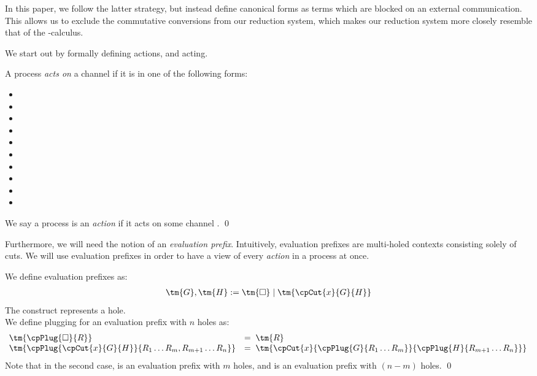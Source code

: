 \documentclass[UKenglish]{llncs}
\begin{document}
In this paper, we follow the latter strategy, but instead define canonical forms
as terms which are blocked on an external communication.
This allows us to exclude the commutative conversions from our reduction system,
which makes our reduction system more closely resemble that of the
\textpi-calculus.

We start out by formally defining actions, and acting.
\begin{definition}[Actions]\label{def:cp-action}
  A process  \emph{acts on} a channel  if it is in one of the
  following forms:
  \begin{multicols}{3}
    \begin{itemize}[noitemsep,topsep=0pt,parsep=0pt,partopsep=0pt]
    \item {}
    \item {}
    \item {}
    \item {}
    \item {}
    \item {}
    \item {}
    \item {}
    \item {}
    \item {}
    \end{itemize}
  \end{multicols}
  \noindent
  We say a process  is an \emph{action} if it acts on some channel .
  \qed
\end{definition}
Furthermore, we will need the notion of an \emph{evaluation prefix}.
Intuitively, evaluation prefixes are multi-holed contexts consisting solely of
cuts. We will use evaluation prefixes in order to have a view of every
\emph{action} in a process at once.
\begin{definition}\label{def:cp-evaluation-prefixes}
  We define evaluation prefixes as:
  \begin{align*}
    \tm{G}, \tm{H} := \tm{\Box} \mid \tm{\cpCut{x}{G}{H}}
  \end{align*}
  The \tm{\Box} construct represents a hole.
  \\
  We define plugging for an evaluation prefix with $n$ holes as:
  \begin{align*}
    \!\begin{array}{ll}
      \tm{\cpPlug{\Box}{R}} & = \; \tm{R} \\
      \tm{\cpPlug{\cpCut{x}{G}{H}}{R_1 \dots R_m, R_{m+1} \dots R_{n}}}
                            & = \; \tm{\cpCut{x}{\cpPlug{G}{R_1 \dots R_m}}{\cpPlug{H}{R_{m+1} \dots R_n}}}
    \end{array}
  \end{align*}
  Note that in the second case,  is an evaluation prefix with $m$ holes,
  and  is an evaluation prefix with $(n-m)$ holes.
  \qed
\end{definition}
\end{document}

